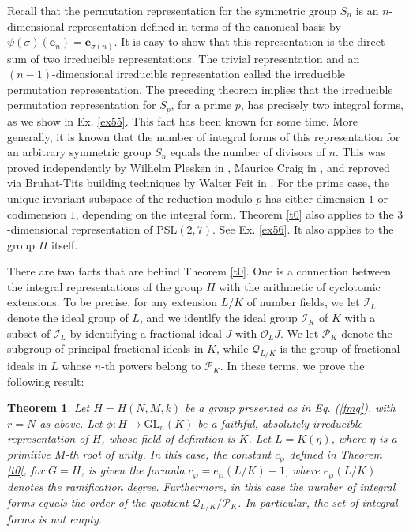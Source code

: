 \documentclass{article}
\newtheorem{theo}{Theorem}
\theoremstyle{definition}
\begin{document}
Recall that the permutation representation for the symmetric group $S_n$ is
an $n$-dimensional representation defined in terms of the canonical basis by 
$\psi(\sigma)(\mathbf{e}_n)=\mathbf{e}_{\sigma(n)}$. It is easy to show that
this representation is the direct sum of two irreducible representations. The 
trivial representation and an $(n-1)$-dimensional irreducible representation
called the irreducible permutation representation. The preceding theorem implies
that the irreducible permutation representation for $S_p$, for a prime $p$, has
precisely two integral forms, as we show in Ex. \ref{ex55}.
This fact has been known for some time. More 
generally, it is known that the number of
integral forms of this representation for an arbitrary
symmetric group $S_n$ equals the
number of divisors of $n$. 
This was proved independently by Wilhelm
Plesken in \cite{Ple74}, Maurice
Craig in \cite{Cra76}, and reproved via
Bruhat-Tits building techniques 
by Walter Feit in \cite{Fei98}.
For the prime case, the unique invariant subspace
of the reduction modulo $p$ has either dimension $1$
or codimension $1$, depending on the integral form.
Theorem \ref{t0} also applies to the $3$-dimensional
representation of $\mathrm{PSL}(2,7)$. See Ex. \ref{ex56}.
It also applies to the group $H$ itself.

There are two facts that are behind Theorem \ref{t0}. One is a connection
between the integral representations of the group $H$
with the arithmetic of cyclotomic extensions. To be precise, for any extension
$L/K$ of number fields, we let $\mathcal{I}_L$ denote the ideal group of $L$,
and we identlfy the ideal group $\mathcal{I}_K$ of $K$ with a subset of 
$\mathcal{I}_L$ by identifying a fractional ideal $J$ with $\mathcal{O}_LJ$.
We let $\mathcal{P}_K$ denote the subgroup of principal fractional ideals in $K$,
while $\mathcal{Q}_{L/K}$ is the group of fractional ideals in $L$ whose $n$-th
powers belong to $\mathcal{P}_K$. In these terms, we prove the following result:

\begin{theo}\label{t2}
    Let $H=H(N,M,k)$ be a group presented as in Eq. (\ref{fmg}), 
    with $r=N$ as above. Let 
    $\phi:H\rightarrow\mathrm{GL}_n(K)$ be a
    faithful, absolutely irreducible representation of $H$,
    whose field of definition is $K$. Let $L=K(\eta)$, where
    $\eta$ is a primitive $M$-th root of unity. In this case, the
    constant $c_\wp$ defined in Theorem \ref{t0}, for $G=H$,
    is given the formula $c_\wp=e_\wp(L/K)-1$, where $e_\wp(L/K)$ denotes
    the ramification degree. Furthermore, in this case the number
    of integral forms equals the order of the quotient
    $\mathcal{Q}_{L/K}/\mathcal{P}_K$. In particular, the set of
    integral forms is not empty.
\end{theo}
\end{document}
